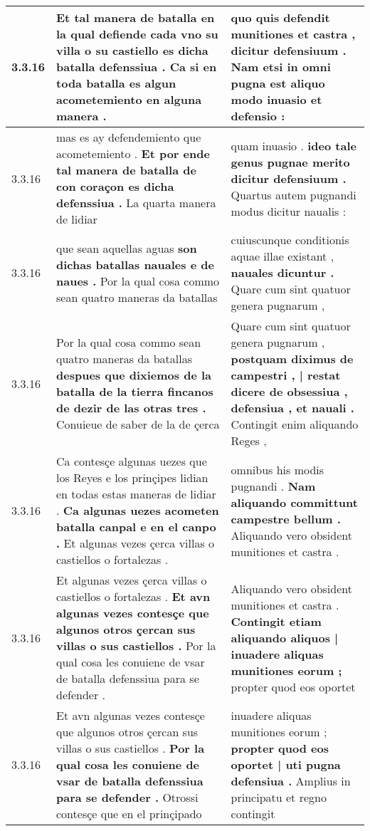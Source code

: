 \begin{tabular}{|p{1cm}|p{6.5cm}|p{6.5cm}|}
3.3.16 & Et tal manera de batalla en la qual defiende cada vno su villa o su castiello \textbf{ es dicha batalla defenssiua . } Ca si en toda batalla es algun acometemiento en alguna manera . & quo quis defendit munitiones et castra , \textbf{ dicitur defensiuum . } Nam etsi in omni pugna est aliquo modo inuasio et defensio : \\\hline
3.3.16 & mas es ay defendemiento que acometemiento . \textbf{ Et por ende tal manera de batalla de con coraçon es dicha defenssiua . } La quarta manera de lidiar & quam inuasio . \textbf{ ideo tale genus pugnae merito dicitur defensiuum . } Quartus autem pugnandi modus dicitur naualis : \\\hline
3.3.16 & que sean aquellas aguas \textbf{ son dichas batallas nauales e de naues . } Por la qual cosa commo sean quatro maneras da batallas & cuiuscunque conditionis aquae illae existant , \textbf{ nauales dicuntur . } Quare cum sint quatuor genera pugnarum , \\\hline
3.3.16 & Por la qual cosa commo sean quatro maneras da batallas \textbf{ despues que dixiemos de la batalla de la tierra fincanos de dezir de las otras tres . } Conuieue de saber de la de çerca & Quare cum sint quatuor genera pugnarum , \textbf{ postquam diximus de campestri , | restat dicere de obsessiua , defensiua , et nauali . } Contingit enim aliquando Reges , \\\hline
3.3.16 & Ca contesçe algunas uezes que los Reyes e los prinçipes lidian en todas estas maneras de lidiar . \textbf{ Ca algunas uezes acometen batalla canpal e en el canpo . } Et algunas vezes çerca villas o castiellos o fortalezas . & omnibus his modis pugnandi . \textbf{ Nam aliquando committunt campestre bellum . } Aliquando vero obsident munitiones et castra . \\\hline
3.3.16 & Et algunas vezes çerca villas o castiellos o fortalezas . \textbf{ Et avn algunas vezes contesçe que algunos otros çercan sus villas o sus castiellos . } Por la qual cosa les conuiene de vsar de batalla defenssiua para se defender . & Aliquando vero obsident munitiones et castra . \textbf{ Contingit etiam aliquando aliquos | inuadere aliquas munitiones eorum ; } propter quod eos oportet \\\hline
3.3.16 & Et avn algunas vezes contesçe que algunos otros çercan sus villas o sus castiellos . \textbf{ Por la qual cosa les conuiene de vsar de batalla defenssiua para se defender . } Otrossi contesçe que en el prinçipado & inuadere aliquas munitiones eorum ; \textbf{ propter quod eos oportet | uti pugna defensiua . } Amplius in principatu et regno contingit \\\hline

\end{tabular}
